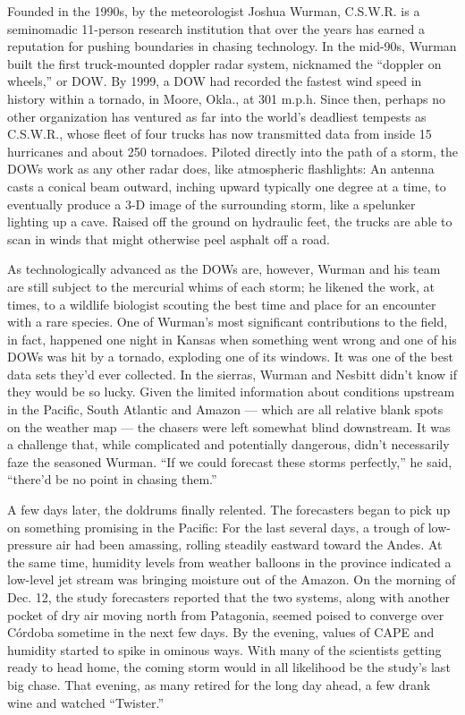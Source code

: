 Founded in the 1990s, by the meteorologist Joshua Wurman, C.S.W.R. is a
seminomadic 11-person research institution that over the years has
earned a reputation for pushing boundaries in chasing technology. In the
mid-90s, Wurman built the first truck-mounted doppler radar system,
nicknamed the ``doppler on wheels,'' or DOW. By 1999, a DOW had recorded
the fastest wind speed in history within a tornado, in Moore, Okla., at
301 m.p.h. Since then, perhaps no other organization has ventured as far
into the world's deadliest tempests as C.S.W.R., whose fleet of four
trucks has now transmitted data from inside 15 hurricanes and about 250
tornadoes. Piloted directly into the path of a storm, the DOWs work as
any other radar does, like atmospheric flashlights: An antenna casts a
conical beam outward, inching upward typically one degree at a time, to
eventually produce a 3-D image of the surrounding storm, like a
spelunker lighting up a cave. Raised off the ground on hydraulic feet,
the trucks are able to scan in winds that might otherwise peel asphalt
off a road.

As technologically advanced as the DOWs are, however, Wurman and his
team are still subject to the mercurial whims of each storm; he likened
the work, at times, to a wildlife biologist scouting the best time and
place for an encounter with a rare species. One of Wurman's most
significant contributions to the field, in fact, happened one night in
Kansas when something went wrong and one of his DOWs was hit by a
tornado, exploding one of its windows. It was one of the best data sets
they'd ever collected. In the sierras, Wurman and Nesbitt didn't know if
they would be so lucky. Given the limited information about conditions
upstream in the Pacific, South Atlantic and Amazon --- which are all
relative blank spots on the weather map --- the chasers were left
somewhat blind downstream. It was a challenge that, while complicated
and potentially dangerous, didn't necessarily faze the seasoned Wurman.
``If we could forecast these storms perfectly,'' he said, ``there'd be
no point in chasing them.''

A few days later, the doldrums finally relented. The forecasters began
to pick up on something promising in the Pacific: For the last several
days, a trough of low-pressure air had been amassing, rolling steadily
eastward toward the Andes. At the same time, humidity levels from
weather balloons in the province indicated a low-level jet stream was
bringing moisture out of the Amazon. On the morning of Dec. 12, the
study forecasters reported that the two systems, along with another
pocket of dry air moving north from Patagonia, seemed poised to converge
over Córdoba sometime in the next few days. By the evening, values of
CAPE and humidity started to spike in ominous ways. With many of the
scientists getting ready to head home, the coming storm would in all
likelihood be the study's last big chase. That evening, as many retired
for the long day ahead, a few drank wine and watched ``Twister.''

